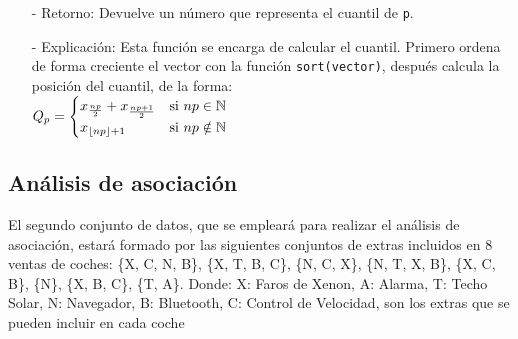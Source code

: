 \documentclass[a4paper, 12pt]{article}
\begin{document}
\begin{itemize}
\begin{itemize}
			\item[-] Retorno: Devuelve un número que representa el cuantil de \texttt{p}. 
			
			\item[-] Explicación: Esta función se encarga de calcular el cuantil. Primero ordena de forma creciente el vector con la función \texttt{sort(vector)}, después calcula la posición del cuantil, de la forma: \\
			$\text{\texttt{{$Q_{p}$}}} = \begin{cases} 
				x_{\frac{np}{2}}+x_{\frac{np+1}{2}} & \text{si } np \in \mathbb{N} \\
				x_{\lfloor{np}\rfloor +1} & \text{si } np \notin \mathbb{N}
			\end{cases}$
		\end{itemize}
	\end{itemize}
	
	\subsection{Análisis de asociación}
	El segundo conjunto de datos, que se empleará para realizar el análisis de asociación, estará formado por las siguientes conjuntos de extras incluidos en 8 ventas de coches: \{X, C, N, B\}, \{X, T, B, C\}, \{N, C, X\}, \{N, T, X, B\}, \{X, C, B\}, \{N\}, \{X, B, C\}, \{T, A\}. Donde: {X: Faros de Xenon, A: Alarma, T: Techo Solar, N: Navegador, B: Bluetooth, C: Control de Velocidad}, son los extras que se pueden incluir en cada coche
		
\end{document}
